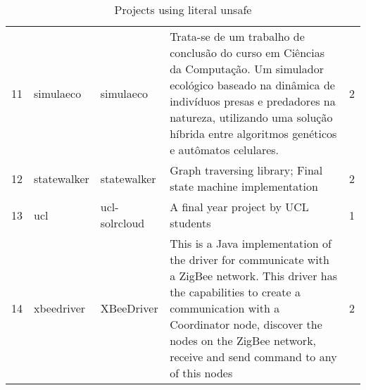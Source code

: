 \begin{table}[ht]
\begin{tabular}{rlllr}
  11 & simulaeco & simulaeco & Trata-se de um trabalho de conclusão do curso em Ciências da Computação. Um simulador ecológico baseado na dinâmica de indivíduos presas e predadores na natureza, utilizando uma solução híbrida entre algoritmos genéticos e autômatos celulares. &   2 \\ 
  12 & statewalker & statewalker & Graph traversing library; Final state machine implementation &   2 \\ 
  13 & ucl & ucl-solrcloud & A final year project by UCL students &   1 \\ 
  14 & xbeedriver & XBeeDriver & This is a Java implementation of the driver for communicate with a ZigBee network. This driver has the capabilities to create a communication with a Coordinator node, discover the nodes on the ZigBee network, receive and send command to any of this nodes &   2 \\ 
   \hline
\end{tabular}
\caption{Projects using literal unsafe} 
\label{table:literal}
\end{table}
